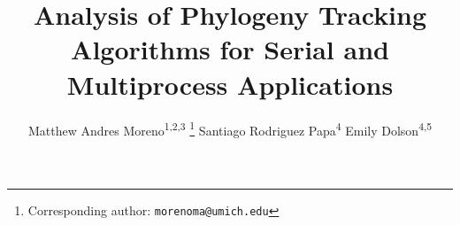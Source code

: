 \title{ Analysis of Phylogeny Tracking Algorithms for Serial and Multiprocess Applications }
\author{
    Matthew Andres Moreno\textsuperscript{1,2,3} \thanks{Corresponding author: \texttt{morenoma@umich.edu}} \quad
    Santiago Rodriguez Papa\textsuperscript{4} \quad
    Emily Dolson\textsuperscript{4,5} \quad
}
\date{}

\newcommand{\affil}[1]{\textsuperscript{#1}}
\newcommand{\affiliations}{
\affil{1} Ecology and Evolutionary Biology, University of Michigan, Ann Arbor, United States \\
\affil{2} Center for the Study of Complex Systems, University of Michigan, Ann Arbor, United States \\
\affil{3} Michigan Institute for Data Science, University of Michigan, Ann Arbor, United States
\affil{4} Department of Computer Science and Engineering, Michigan State University, East Lansing, United States \\
\affil{5} Ecology, Evolution, and Behavior, Michigan State University, East Lansing, United States \\
}

\maketitle



